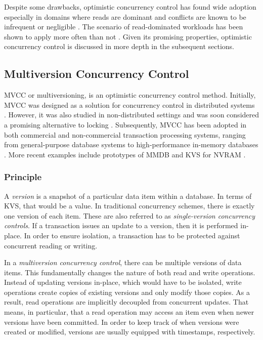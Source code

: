 Despite some drawbacks, optimistic concurrency control has found wide adoption
especially in domains where reads are dominant and conflicts are known to be
infrequent or negligible \cite{carey1986performance, larson2011high,
wu2017empirical}. The scenario of read-dominated workloads has been shown to
apply more often than not \cite{andrei2017sap, wang2017efficiently}. Given its
promising properties, optimistic concurrency control is discussed in more depth
in the subsequent sections.

\subsection{Multiversion Concurrency Control}

\ac{MVCC} or multiversioning, is an optimistic concurrency control method.
Initially, \ac{MVCC} was designed as a solution for concurrency control in
distributed systems \cite{reed1978naming}. However, it was also studied in
non-distributed settings and was soon considered a promising alternative to
locking \cite{kung1981optimistic, bernstein1983multiversion, carey1983multiple,
hadzilacos1986algorithmic, carey1986performance}. Subsequently, \ac{MVCC} has
been adopted in both commercial and non-commercial transaction processing
systems, ranging from general-purpose database systems to high-performance
in-memory databases \cite{larson2011high, lee2013high, diaconu2013hekaton,
schwalb2015efficient}. More recent examples include prototypes of \ac{MMDB} and
\ac{KVS} for \ac{NVRAM} \cite{bailey2013exploring, zhou2016nvht,
oukid2014sofort, schwalb2016hyrise}.

\subsubsection{Principle}

A \emph{version} is a snapshot of a particular data item within a database. In
terms of \ac{KVS}, that would be a value. In traditional concurrency schemes,
there is exactly one version of each item. These are also referred to as
\emph{single-version concurrency controls}. If a transaction issues an update to
a version, then it is performed in-place. In order to ensure isolation, a
transaction has to be protected against concurrent reading or writing.

In a \emph{multiversion concurrency control}, there can be multiple versions of
data items. This fundamentally changes the nature of both read and write
operations. Instead of updating versions in-place, which would have to be
isolated, write operations create copies of existing versions and only modify
those copies. As a result, read operations are implicitly decoupled from
concurrent updates. That means, in particular, that a read operation may access
an item even when newer versions have been committed. In order to keep track of
when versions were created or modified, versions are usually equipped with
timestamps, respectively.

